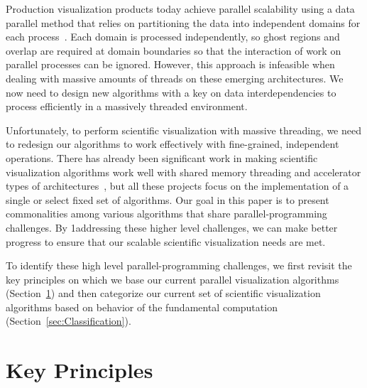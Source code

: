 \documentclass{sig-alternate}
\newcommand*{\lcite}[1]{~\cite{#1}}
\begin{document}
Production visualization products today achieve parallel scalability using
a data parallel method that relies on partitioning the data into
independent domains for each process\lcite{Ahrens2001}. Each domain is
processed independently, so ghost regions and overlap are required at
domain boundaries so that the interaction of work on parallel processes can
be ignored. However, this approach is infeasible when dealing with massive
amounts of threads on these emerging architectures. We now need to design
new algorithms with a key on data interdependencies to process efficiently
in a massively threaded environment.

Unfortunately, to perform scientific visualization with massive threading,
we need to redesign our algorithms to work effectively with fine-grained,
independent operations. There has already been significant work in making
scientific visualization algorithms work well with shared memory threading
and accelerator types of
architectures\lcite{PISTON,Dyken2008,Maynard2013,EAVL,Meredith2012}, but
all these projects focus on the implementation of a single or select fixed
set of algorithms. Our goal in this paper is to present commonalities among
various algorithms that share parallel-programming challenges. By
1addressing these higher level challenges, we can make better progress to
ensure that our scalable scientific visualization needs are met.

To identify these high level parallel-programming challenges, we first
revisit the key principles on which we base our current parallel
visualization algorithms (Section~\ref{sec:KeyPrinciples}) and then
categorize our current set of scientific visualization algorithms based on
behavior of the fundamental computation
(Section~\ref{sec:Classification}).


\section{Key Principles}
\label{sec:KeyPrinciples}
\end{document}
